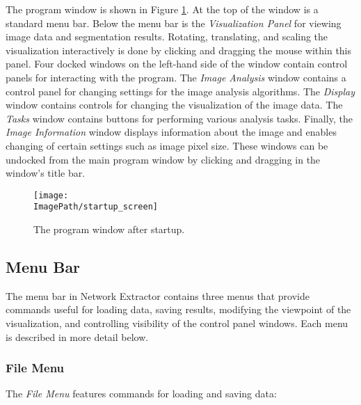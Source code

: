 \documentclass[11pt,titlepage,twoside]{article}
\begin{document}
The program window is shown in Figure \ref{fig:ProgramWindow}. At the top of the window is a standard menu bar. Below the menu bar is the \emph{Visualization Panel} for viewing image data
and segmentation results. Rotating, translating, and scaling the visualization interactively is done by clicking and dragging the mouse within this panel. Four docked windows on the left-hand
side of the window contain control panels for interacting with the program. The \emph{Image Analysis} window contains a control panel for changing settings for the image analysis algorithms. The \emph{Display} window contains controls for changing the visualization of the image data.
The \emph{Tasks} window contains buttons for performing various analysis tasks. Finally, the \emph{Image Information} window  displays information about the image and enables changing of certain settings such as image pixel size. These windows can be undocked from the main 
program window by clicking and dragging in the window's title bar.

\begin{figure}[htbp] %
   \centering
   \texttt{[image: \\ImagePath/startup\_screen]} 
   \caption{The program window after startup.}
   \label{fig:ProgramWindow}
\end{figure}

\subsection{Menu Bar}

The menu bar in Network Extractor contains three menus that
provide commands useful for loading data, saving results,
modifying the viewpoint of the visualization, and controlling visibility
of the control panel windows. Each menu is described in more detail below.

\subsubsection{File Menu}

The \emph{File Menu} features commands for loading and saving data:
\end{document}
